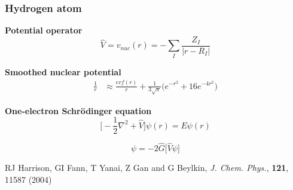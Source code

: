 \begin{frame}
    \frametitle{Hydrogen atom}
    \centering
    \textbf{Potential operator}
    \begin{equation}
	\nonumber
	\hat{V} = v_{nuc}(r) = -\sum_I\frac{Z_I}{|r-R_I|}
    \end{equation}

    \vspace{5mm}

    \textbf{Smoothed nuclear potential}
    \begin{align}
	\nonumber
	\frac{1}{r} &\approx \frac{erf(r)}{r} +
	\frac{1}{3\sqrt{\pi}}\big(e^{-r^2}+16e^{-4r^2}\big)
    \end{align}

    \vspace{5mm}

    \textbf{One-electron Schr\"{o}dinger equation}
    \begin{equation}
        \nonumber
        \Big[-\frac{1}{2}\nabla^2 + \hat{V}\Big]\psi(r) = E \psi(r)
    \end{equation}

    \vspace{1mm}

    \begin{equation}
        \nonumber
        \psi = -2\hat{G} \Big[\hat{V} \psi \Big]
    \end{equation}

    \vspace{5mm}

    \centering
    \tiny
    RJ Harrison, GI Fann, T Yanai, Z Gan and G Beylkin,
    {\it J. Chem. Phys.}, 
    \textbf{121},
    11587 (2004)
\end{frame}

